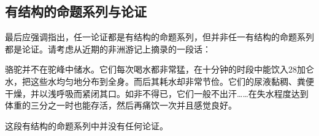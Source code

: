 \subsection{有结构的命题系列与论证}

最后应强调指出，任一论证都是有结构的命题系列，但并非任一有结构的命题系列都是论证。请考虑从近期的非洲游记上摘录的一段话：

\begin{displayquote}
骆驼并不在驼峰中储水。它们每次喝水都非常猛，在十分钟的时段中能饮入28加仑水，把这些水均匀地分布到全身。而后其耗水却非常节俭。它们的尿液黏稠、粪便干燥，并以浅呼吸而紧闭其口。如非不得已，它们一般不出汗……在失水程度达到体重的三分之一时也能存活，然后再痛饮一次并且感觉良好。\cite{langewiesche1996}
\end{displayquote}

这段有结构的命题系列中并没有任何论证。

\begin{center}
\end{center} 